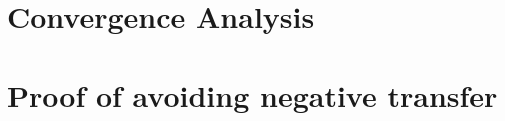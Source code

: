 \section{Convergence Analysis}\label{appd:convg}



\section{Proof of avoiding negative transfer}\label{appd:proof}


